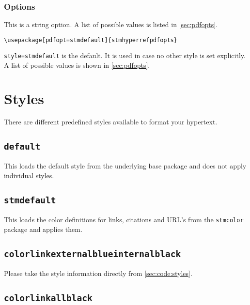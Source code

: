 \documentclass[%
  type=article,%
  layout=koma,%
  conditionallox=true,%
  conditionalloxnewpage=false,%
  date=true,%
  index=true,%
  listings=true%
]{stmtext}
\begin{document}
\subsubsection{Options}
\label{sec:usage:preamble:pdfopts:options}

This is a string option. A list of possible values is listed in \cref{sec:pdfopts}.

\begin{verbatim}
\usepackage[pdfopt=stmdefault]{stmhyperrefpdfopts}
\end{verbatim}

\texttt{style=stmdefault} is the default. It is used in case no other style is set explicitly. A list of possible values is shown in \autoref{sec:pdfopts}.

\section{Styles}
\label{sec:styles}

There are different predefined styles available to format your hypertext.

\subsection{\protect\texttt{default}}
\label{sec:styles:default}

This loads the default style from the underlying base package and does not apply individual styles.

\subsection{\protect\texttt{stmdefault}}
\label{sec:styles:stmdefault}

This loads the color definitions for links, citations and URL's from the \texttt{stmcolor} package and applies them.

\subsection{\protect\texttt{colorlinkexternalblueinternalblack}}
\label{sec:styles:colorlinkexternalblueinternalblack}

Please take the style information directly from \cref{sec:code:styles}.

\subsection{\protect\texttt{colorlinkallblack}}
\label{sec:styles:colorlinkallblack}
\end{document}

